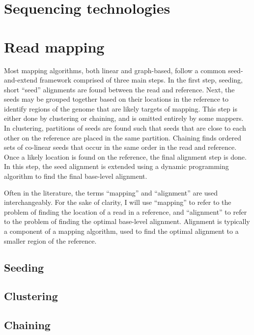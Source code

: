 \documentclass[11pt]{ucscthesis}
\begin{document}
\section{Sequencing technologies}
\label{sec:background:sequencing}

\section{Read mapping}
\label{sec:background:mapping}
Most mapping algorithms, both linear and graph-based, follow a common seed-and-extend framework comprised of three main steps.
In the first step, seeding, short ``seed'' alignments are found between the read and reference.
Next, the seeds may be grouped together based on their locations in the reference to identify regions of the genome that are likely targets of mapping.
This step is either done by clustering or chaining, and is omitted entirely by some mappers.
In clustering, partitions of seeds are found such that seeds that are close to each other on the reference are placed in the same partition.
Chaining finds ordered sets of co-linear seeds that occur in the same order in the read and reference. 
Once a likely location is found on the reference, the final alignment step is done.
In this step, the seed alignment is extended using a dynamic programming algorithm to find the final base-level alignment.

Often in the literature, the terms ``mapping'' and ``alignment'' are used interchangeably.
For the sake of clarity, I will use ``mapping'' to refer to the problem of finding the location of a read in a reference, and ``alignment'' to refer to the problem of finding the optimal base-level alignment.
Alignment is typically a component of a mapping algorithm, used to find the optimal alignment to a smaller region of the reference.

\subsection{Seeding}

\subsection{Clustering}

\subsection{Chaining}
\end{document}
